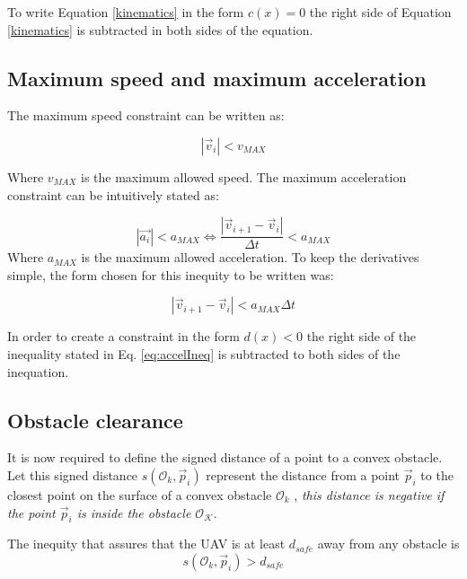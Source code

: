 To write Equation \ref{kinematics} in the form $c(x)=0$ the right side of Equation \ref{kinematics} is subtracted in both sides of the equation.
 
\subsection{Maximum speed and maximum acceleration}
The maximum speed constraint can be written as:

\begin{equation}
     |\vec{v}_i| < v_{MAX}
     \label{eq:maxSpeedRaw}
\end{equation}

Where $v_{MAX}$ is the maximum allowed speed. The maximum acceleration constraint can be intuitively stated as:

\begin{equation}
     |\vec{a_i}| < a_{MAX} \Leftrightarrow \frac{|\vec{v}_{i+1} - \vec{v}_{i}|}{\Delta t}  < a_{MAX}
     \label{eq:maxAccelraw}
\end{equation}
Where $a_{MAX}$ is the maximum allowed acceleration. To keep the derivatives simple, the form chosen for this inequity to be written was:

\begin{equation}
  |\vec{v}_{i+1} - \vec{v}_{i}| <  a_{MAX} \Delta t
  \label{eq:accelIneq}
\end{equation}{}

In order to create a constraint in the form $d(x)<0$ the right side of the inequality stated in Eq. \ref{eq:accelIneq} is subtracted to both sides of the inequation.

\subsection{Obstacle clearance}
\label{section:obstacleClearance}

It is now required to define the signed distance of a point to a convex obstacle. Let this signed distance $s(\mathcal{O}_k, \vec{p}_i)$ represent the distance from a point $\vec{p}_i$ to the closest point on the surface of a convex obstacle $\mathcal{O}_k$ , \emph{this distance is negative if the point $\vec{p}_i$ is inside the obstacle $\mathcal{O_K}$}.

The inequity that assures that the UAV is at least $d_{safe}$ away from any obstacle is
\begin{equation}
    s(\mathcal{O}_k, \vec{p}_i) > d_{safe}
\end{equation}

